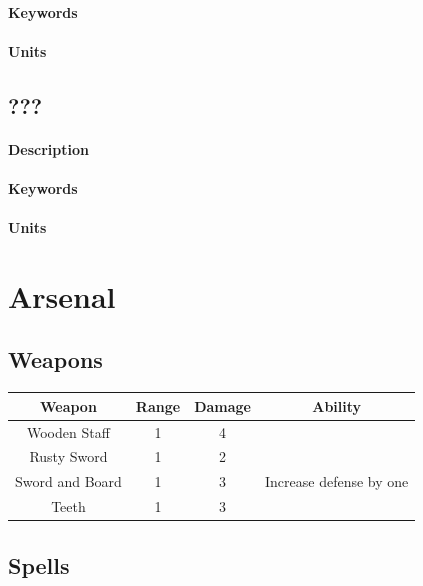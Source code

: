 \documentclass[a5paper,pagesize,10pt,bibtotoc,pointlessnumbers,
normalheadings,DIV=9,twoside=false]{scrbook}
\begin{document}
\subsubsection{Keywords}
\emph{}

\subsubsection{Units}

\newpage
\section{???}

\subsubsection{Description}

\subsubsection{Keywords}
\emph{}

\subsubsection{Units}

\chapter{Arsenal}

\section{Weapons}

 \begin{tabular}{||c c c c||} 
 \hline
 Weapon & Range & Damage & Ability \\
\hline \hline
Wooden Staff & 1 & 4 &  \\
\hline
Rusty Sword & 1 & 2 &  \\
\hline
Sword and Board & 1 & 3 & Increase defense by one \\
\hline
Teeth & 1 & 3 & \\
\hline
 
 \end{tabular}
\newpage
\section{Spells}
\end{document}
